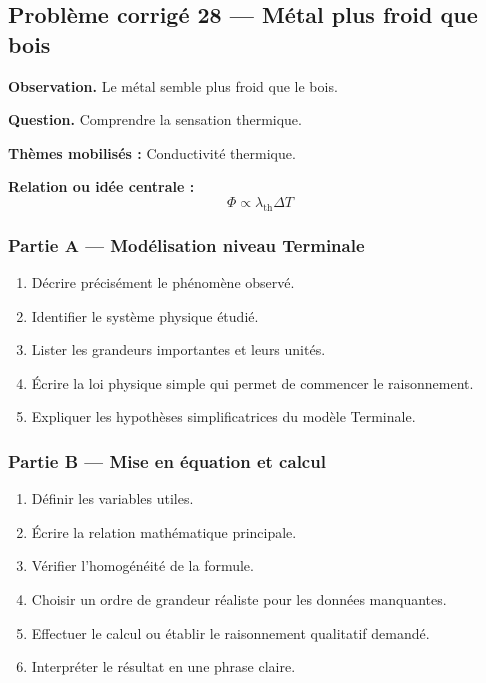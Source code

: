 \documentclass[11pt,a4paper]{article}
\begin{document}
\subsection{Problème corrigé 28 — Métal plus froid que bois}

\begin{exercicebox}
\textbf{Observation.} Le métal semble plus froid que le bois.

\medskip
\textbf{Question.} Comprendre la sensation thermique.

\medskip
\textbf{Thèmes mobilisés :} Conductivité thermique.

\medskip
\textbf{Relation ou idée centrale :}
\[
\Phi\propto\lambda_{\mathrm{th}}\Delta T
\]
\end{exercicebox}

\subsubsection*{Partie A — Modélisation niveau Terminale}

\begin{enumerate}
  \item Décrire précisément le phénomène observé.
  \item Identifier le système physique étudié.
  \item Lister les grandeurs importantes et leurs unités.
  \item Écrire la loi physique simple qui permet de commencer le raisonnement.
  \item Expliquer les hypothèses simplificatrices du modèle Terminale.
\end{enumerate}

\subsubsection*{Partie B — Mise en équation et calcul}

\begin{enumerate}
  \item Définir les variables utiles.
  \item Écrire la relation mathématique principale.
  \item Vérifier l'homogénéité de la formule.
  \item Choisir un ordre de grandeur réaliste pour les données manquantes.
  \item Effectuer le calcul ou établir le raisonnement qualitatif demandé.
  \item Interpréter le résultat en une phrase claire.
\end{enumerate}
\end{document}
